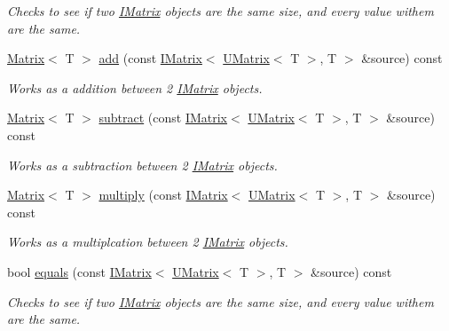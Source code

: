 \begin{DoxyCompactItemize}
\begin{DoxyCompactList}\small\item\em Checks to see if two \mbox{\hyperlink{class_i_matrix}{I\+Matrix}} objects are the same size, and every value withem are the same. \end{DoxyCompactList}\item 
\mbox{\hyperlink{class_matrix}{Matrix}}$<$ T $>$ \mbox{\hyperlink{class_t_matrix_a9673d1a97a3408923022162571683b74}{add}} (const \mbox{\hyperlink{class_i_matrix}{I\+Matrix}}$<$ \mbox{\hyperlink{class_u_matrix}{U\+Matrix}}$<$ T $>$, T $>$ \&source) const
\begin{DoxyCompactList}\small\item\em Works as a addition between 2 \mbox{\hyperlink{class_i_matrix}{I\+Matrix}} objects. \end{DoxyCompactList}\item 
\mbox{\hyperlink{class_matrix}{Matrix}}$<$ T $>$ \mbox{\hyperlink{class_t_matrix_aef4ae69df8d1cae7b023c3d07e9854d6}{subtract}} (const \mbox{\hyperlink{class_i_matrix}{I\+Matrix}}$<$ \mbox{\hyperlink{class_u_matrix}{U\+Matrix}}$<$ T $>$, T $>$ \&source) const
\begin{DoxyCompactList}\small\item\em Works as a subtraction between 2 \mbox{\hyperlink{class_i_matrix}{I\+Matrix}} objects. \end{DoxyCompactList}\item 
\mbox{\hyperlink{class_matrix}{Matrix}}$<$ T $>$ \mbox{\hyperlink{class_t_matrix_a7c45285ff66e2438d39821a48a03b5b7}{multiply}} (const \mbox{\hyperlink{class_i_matrix}{I\+Matrix}}$<$ \mbox{\hyperlink{class_u_matrix}{U\+Matrix}}$<$ T $>$, T $>$ \&source) const
\begin{DoxyCompactList}\small\item\em Works as a multiplcation between 2 \mbox{\hyperlink{class_i_matrix}{I\+Matrix}} objects. \end{DoxyCompactList}\item 
bool \mbox{\hyperlink{class_t_matrix_ab97e94aa95695c31909158643e11bd1e}{equals}} (const \mbox{\hyperlink{class_i_matrix}{I\+Matrix}}$<$ \mbox{\hyperlink{class_u_matrix}{U\+Matrix}}$<$ T $>$, T $>$ \&source) const
\begin{DoxyCompactList}\small\item\em Checks to see if two \mbox{\hyperlink{class_i_matrix}{I\+Matrix}} objects are the same size, and every value withem are the same. \end{DoxyCompactList}\item 

\end{DoxyCompactItemize}
